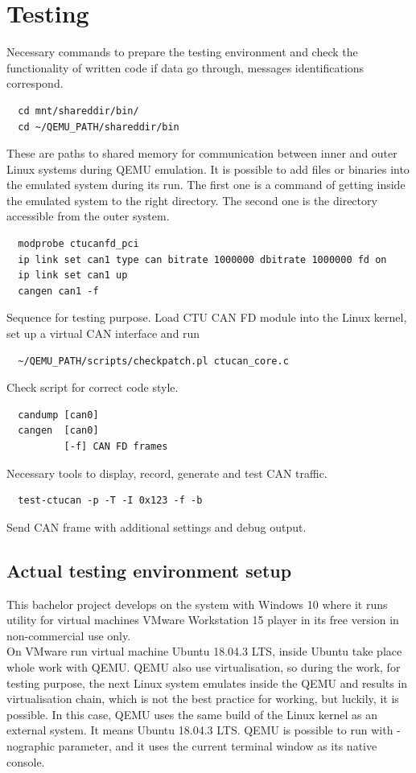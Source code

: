 \documentclass{ctuthesis}
\begin{document}
\chapter{Testing}
 Necessary commands to prepare the testing environment and check the functionality of written code if data go through, messages identifications correspond.
 \begin{verbatim}  cd mnt/shareddir/bin/
  cd ~/QEMU_PATH/shareddir/bin\end{verbatim}
 These are paths to shared memory for communication between inner and outer Linux systems during QEMU emulation. It is possible to add files or binaries into the emulated system during its run. The first one is a command of getting inside the emulated system to the right directory. The second one is the directory accessible from the outer system.
 \begin{verbatim}  modprobe ctucanfd_pci
  ip link set can1 type can bitrate 1000000 dbitrate 1000000 fd on
  ip link set can1 up
  cangen can1 -f\end{verbatim}
 Sequence for testing purpose. Load CTU CAN FD module into the Linux kernel, set up a virtual CAN interface and run
 \begin{verbatim}  ~/QEMU_PATH/scripts/checkpatch.pl ctucan_core.c\end{verbatim}
 Check script for correct code style.
 \begin{verbatim}  candump [can0]
  cangen  [can0]
          [-f] CAN FD frames\end{verbatim}
 Necessary tools to display, record, generate and test CAN traffic. \cite{can-utils}
 \begin{verbatim}  test-ctucan -p -T -I 0x123 -f -b\end{verbatim}
 Send CAN frame with additional settings and debug output.

 \section{Actual testing environment setup}
  This bachelor project develops on the system with Windows 10 where it runs utility for virtual machines VMware  Workstation 15 player in its free version in non-commercial use only. \cite{vmware} \\
  On VMware run virtual machine Ubuntu 18.04.3 LTS, \cite{ubuntu} inside Ubuntu take place whole work with QEMU. QEMU also use virtualisation, so during the work, for testing purpose, the next Linux system emulates inside the QEMU and results in virtualisation chain, which is not the best practice for working, but luckily, it is possible. In this case, QEMU uses the same build of the Linux kernel as an external system. It means Ubuntu 18.04.3 LTS. QEMU is possible to run with -nographic parameter, and it uses the current terminal window as its native console. \\
\end{document}
